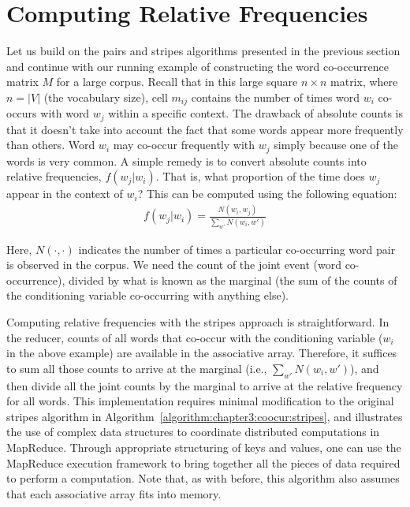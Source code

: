 \section{Computing Relative Frequencies}
\label{chapter3:cond-prob}

Let us build on the pairs and stripes algorithms presented in the
previous section and continue with our running example of constructing
the word co-occurrence matrix $M$ for a large corpus.  Recall that in
this large square $n \times n$ matrix, where $n=|V|$ (the vocabulary
size), cell $m_{ij}$ contains the number of times word $w_i$ co-occurs
with word $w_j$ within a specific context.  The drawback of absolute
counts is that it doesn't take into account the fact that some words
appear more frequently than others.  Word $w_i$ may co-occur
frequently with $w_j$ simply because one of the words is very common.
A simple remedy is to convert absolute counts into relative
frequencies, $f(w_j|w_i)$.  That is, what proportion of the time does
$w_j$ appear in the context of $w_i$?  This can be computed using the
following equation:
\begin{align}
f(w_j|w_i) = \frac{N(w_i,w_j)}{\sum_{w'}{N(w_i,w')}}
\end{align}

\noindent Here, $N(\cdot, \cdot)$ indicates the number of times a
particular co-occurring word pair is observed in the corpus.  We need
the count of the joint event (word co-occurrence), divided by what is
known as the marginal (the sum of the counts of the conditioning
variable co-occurring with anything else).

Computing relative frequencies with the stripes approach is
straightforward.  In the reducer, counts of all words that co-occur
with the conditioning variable ($w_i$ in the above example) are
available in the associative array.  Therefore, it suffices to sum all
those counts to arrive at the marginal (i.e., $\sum_{w'}{N(w_i,w')}$),
and then divide all the joint counts by the marginal to arrive at the
relative frequency for all words.  This implementation requires
minimal modification to the original stripes algorithm in
Algorithm~\ref{algorithm:chapter3:coocur:stripes}, and illustrates the use
of complex data structures to coordinate distributed computations in
MapReduce.  Through appropriate structuring of keys and values, one
can use the MapReduce execution framework to bring together all the
pieces of data required to perform a computation.  Note that, as with
before, this algorithm also assumes that each associative array fits
into memory.

